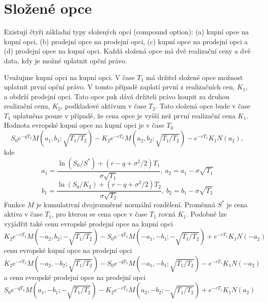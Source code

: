 \documentclass[a4paper]{book}
\begin{document}
\section{Složené opce}

Existují čtyři základní typy složených opcí (compound option): (a) kupní opce na kupní opci, (b) prodejní opce na prodejní opci, (c) kupní opce na prodejní opci a (d) prodejní opce na kupní opci. Každá složená opce má dvě realizační ceny a dvě data, kdy je možné uplatnit opční právo.

Uvažujme kupní opci na kupní opci. V čase $T_1$ má držitel složené opce možnost uplatnit první opční právo. V tomto případě zaplatí první z realizačních cen, $K_1$, a obdrží prodejní opci. Tato opce pak dává držiteli právo koupit za druhou realizační cenu, $K_2$, podkladové aktivum v čase $T_2$. Tato složená opce bude v čase $T_1$ uplatněna pouze v případě, že cena opce je vyšší než první realizační cena $K_1$. Hodnota evropské kupní opce na kupní opci je v čase $T_0$
\begin{equation*}
S_0e^{-qT_2}M(a_1, b_1; \sqrt{T_1 / T_2}) - K_2e^{-rT_2}M(a_2, b_2; \sqrt{T_1 / T_2})-e^{-rT_1}K_1N(a_2),
\end{equation*}
kde
\begin{equation*}
a_1 = \frac{\ln(S_0/S^*)+(r-q+\sigma^2/2)T_1}{\sigma \sqrt{T_1}},~a_2 = a_1 - \sigma \sqrt{T_1}
\end{equation*}
\begin{equation*}
b_1 = \frac{\ln(S_0/K_2)+(r-q+\sigma^2/2)T_2}{\sigma \sqrt{T_2}},~b_2 = b_1 - \sigma \sqrt{T_2}
\end{equation*}
Funkce $M$ je kumulativní dvojrozměrné normální rozdělení. Proměnná $S^*$ je cena aktiva v čase $T_1$, pro kterou se cena opce v čase $T_1$ rovná $K_1$. Podobně lze vyjádřit také cenu evropské prodejní opce na kupní opci
\begin{equation*}
K_2e^{-rT_2}M(-a_2, b_2; -\sqrt{T_1/T_2})-S_0e^{-qT_2}M(-a_1, -b_1; -\sqrt{T_1 / T_2})+e^{-rT_1}K_1N(-a_2)
\end{equation*}
cenu evropské kupní opce na prodejní opci
\begin{equation*}
K_2e^{-rT_2}M(-a_2, -b_2; \sqrt{T_1/T_2})-S_0e^{-qT_2}M(-a_1, -b_1; \sqrt{T_1 / T_2})-e^{-rT_1}K_1N(-a_2)
\end{equation*}
a cenu evropské prodejní opce na prodejní opci
\begin{equation*}
S_0e^{-qT_2}M(a_1, -b_1; -\sqrt{T_1 / T_2}) - K_2e^{-rT_2}M(a_2, -b_2; -\sqrt{T_1 / T_2})+e^{-rT_1}K_1N(a_2)
\end{equation*}
\end{document}
